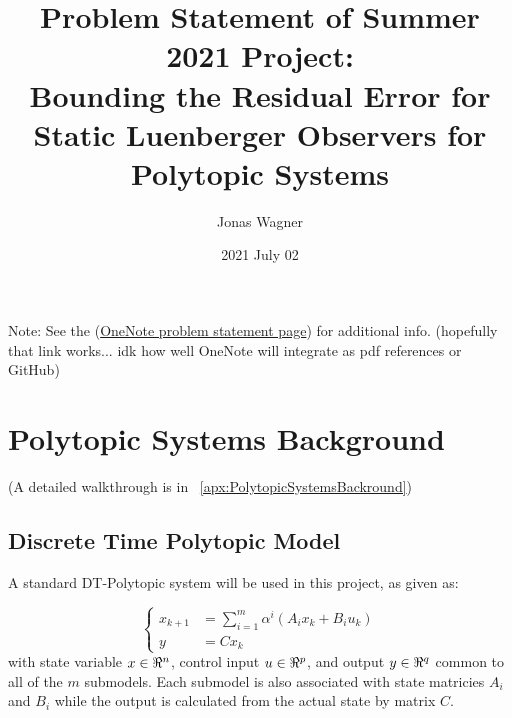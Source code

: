 \documentclass[]{article}
\title{Problem Statement of Summer 2021 Project:\\Bounding the Residual Error for Static Luenberger Observers for Polytopic Systems}
\author{Jonas Wagner}
\date{2021 July 02}
\begin{document}
\maketitle

Note: See the (\href{https://cometmail-my.sharepoint.com/personal/jrw200000_utdallas_edu/_layouts/OneNote.aspx?id=%2Fpersonal%2Fjrw200000_utdallas_edu%2FDocuments%2FResearch%2FPolytopic%20System%20Security%2FPolytopic%20System%20Security&wd=target%28L-Observer%20Residual%20Bounds.one%7C96625950-A6A9-4A54-B35B-46969BCD56B2%2FProblem.%20Statement%7C43940B17-ACF8-4A2E-A2D8-259E68EF4028%2F%29}{OneNote problem statement page})
for additional info. (hopefully that link works... idk how well OneNote will integrate as pdf references or GitHub)


%

%



\section{Polytopic Systems Background}
(A detailed walkthrough is in \appendixname \ \ref{apx:PolytopicSystemsBackround})

\subsection{Discrete Time Polytopic Model}
A standard DT-Polytopic system will be used in this project, as given as:

\begin{equation}\label{eq:DT_poly_sys_def}
	\begin{cases}
		x_{k+1} &= \sum_{i=1}^{m} \alpha^i (A_i x_k + B_i u_k)\\
		y		&= C x_k
	\end{cases}
\end{equation}
with state variable $x \in \real^n$, control input $u \in \real^p$, and output $y \in \real^q$ common to all of the $m$ submodels. Each submodel is also associated with state matricies $A_i$ and $B_i$ while the output is calculated from the actual state by matrix $C$.
\end{document}
